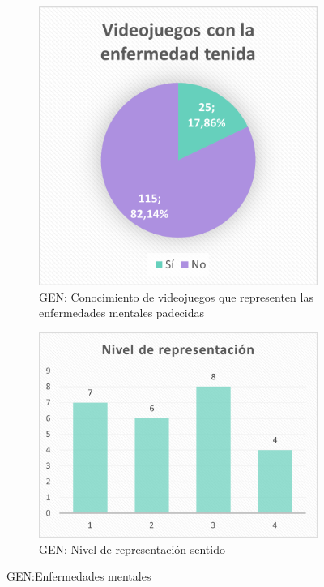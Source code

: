 \documentclass[12pt, a4paper,twoside,titlepage]{book}
\begin{document}
\begin{figure}
\centering
\begin{subfigure}{.5\textwidth}
  \centering
  \includegraphics[width=.95\linewidth]{Imagenes Form GEN/29GENVidenf}
  \caption{GEN: Conocimiento de videojuegos que representen las enfermedades mentales padecidas}
\end{subfigure}%
\begin{subfigure}{.5\textwidth}
  \centering
  \includegraphics[width=.95\linewidth]{Imagenes Form GEN/30GENRep}
  \caption{GEN: Nivel de representación sentido}
\end{subfigure}
\caption{GEN:Enfermedades mentales}
\label{fig:Tenidas}
\end{figure}
\end{document}
